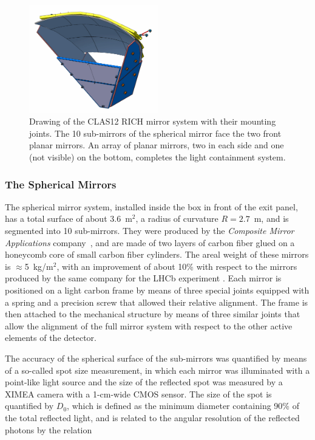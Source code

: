 \documentclass[5p,times,twocolumn]{elsarticle}
\begin{document}
\begin{figure}
\begin{center}
\includegraphics[width=0.50\textwidth]{RICHmirrors.pdf}
\caption{Drawing of the CLAS12 RICH mirror system with their mounting joints. The 10 sub-mirrors of the spherical mirror face the
two front planar mirrors. An array of planar mirrors, two in each side and one (not visible) on the 
bottom, completes the light containment system.}
\label{Fig:RICHmirrors}
\end{center}
\end{figure}

\subsubsection{The Spherical Mirrors}

The spherical mirror system, installed inside the box in front of the exit panel, has a total surface of about 3.6~m$^2$,
a radius of curvature $R= 2.7$~m, and is segmented into 10 sub-mirrors. They were produced by the {\it Composite
Mirror Applications} company~\cite{REF:CMA}, and are made of two layers of carbon fiber glued on a honeycomb
core of small carbon fiber cylinders. The areal weight of these mirrors is $\approx$5~kg/m$^2$, with an
improvement of about 10\% with respect to the mirrors produced by the same company for the LHCb experiment
\cite{REF:LHCbMirrors}. Each mirror is positioned on a light carbon frame by means of three special joints equipped
with a spring and a precision screw that allowed their relative alignment. The frame is then attached to the mechanical
structure by means of three similar joints that allow the alignment of the full mirror system with respect to the other
active elements of the detector.

The accuracy of the spherical surface of the sub-mirrors was quantified by means of a so-called spot size
measurement, in which each mirror was illuminated with a point-like light source and the size of the reflected spot
was measured by a XIMEA camera with a 1-cm-wide CMOS sensor. The size of the spot is quantified by $D_0$, which
is defined as the minimum diameter containing 90\% of the total reflected light, and is related to the angular resolution
of the reflected photons by the relation
\end{document}
